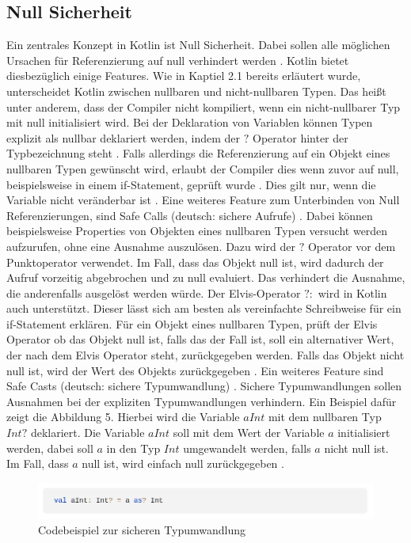 \documentclass{article}
\begin{document}
\subsection{Null Sicherheit}
Ein zentrales Konzept in Kotlin ist Null Sicherheit. Dabei sollen alle möglichen Ursachen für Referenzierung auf null verhindert werden \cite{KotlinLangDoc}. Kotlin bietet diesbezüglich einige Features. Wie in Kaptiel 2.1 bereits erläutert wurde, unterscheidet Kotlin zwischen nullbaren und nicht-nullbaren Typen. Das heißt unter anderem, dass der Compiler nicht kompiliert, wenn ein nicht-nullbarer Typ mit null initialisiert wird. Bei der Deklaration von Variablen können Typen explizit als nullbar deklariert werden, indem der $?$ Operator hinter der Typbezeichnung steht \cite{KotlinLangDoc}. Falls allerdings die Referenzierung auf ein Objekt eines nullbaren Typen gewünscht wird, erlaubt der Compiler dies wenn zuvor auf null, beispielsweise in einem if-Statement, geprüft wurde \cite{KotlinLangDoc}. Dies gilt nur, wenn die Variable nicht veränderbar ist \cite{KotlinLangDoc}. \newline
Eine weiteres Feature zum Unterbinden von Null Referenzierungen, sind Safe Calls (deutsch: sichere Aufrufe) \cite{KotlinLangDoc}. Dabei können beispielsweise Properties von Objekten eines nullbaren Typen versucht werden aufzurufen, ohne eine Ausnahme auszulösen. Dazu wird der $?$ Operator vor dem Punktoperator verwendet. Im Fall, dass das Objekt null ist, wird dadurch der Aufruf vorzeitig abgebrochen und zu null evaluiert. Das verhindert die Ausnahme, die anderenfalls ausgelöst werden würde. \newline
Der Elvis-Operator $?:$ wird in Kotlin auch unterstützt. Dieser lässt sich am besten als vereinfachte Schreibweise für ein if-Statement erklären. Für ein Objekt eines nullbaren Typen, prüft der Elvis Operator ob das Objekt null ist, falls das der Fall ist, soll ein alternativer Wert, der nach dem Elvis Operator steht, zurückgegeben werden. Falls das Objekt nicht null ist, wird der Wert des Objekts zurückgegeben \cite{KotlinLangDoc}. \newline
Ein weiteres Feature sind Safe Casts (deutsch: sichere Typumwandlung) \cite{KotlinLangDoc}. Sichere Typumwandlungen sollen Ausnahmen bei der expliziten Typumwandlungen verhindern. Ein Beispiel dafür zeigt die Abbildung 5. Hierbei wird die Variable $aInt$ mit dem nullbaren Typ $Int?$ deklariert. Die Variable $aInt$ soll mit dem Wert der Variable $a$ initialisiert werden, dabei soll $a$ in den Typ $Int$ umgewandelt werden, falls $a$ nicht null ist. Im Fall, dass $a$ null ist, wird einfach null zurückgegeben \cite{KotlinLangDoc}.
\begin{figure}[!htb]
    \centering
    \includegraphics[width=\linewidth]{img/SafeCast.png}
    \caption{Codebeispiel zur sicheren Typumwandlung\footnotemark}
\end{figure}
\end{document}
